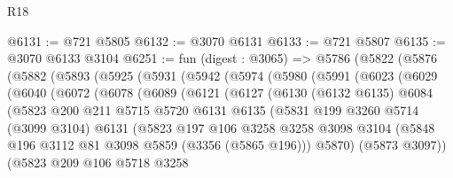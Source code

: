 \begin{lexlean}{R18}
\begin{coremodule}
@6131 := @721 @5805
@6132 := @3070 @6131
@6133 := @721 @5807
@6135 := @3070 @6133 @3104
@6251 := fun (digest : @3065) =>
  @5786
    (@5822
      (@5876
        (@5882
          (@5893
            (@5925
              (@5931
                (@5942
                  (@5974
                    (@5980
                      (@5991
                        (@6023
                          (@6029
                            (@6040
                              (@6072
                                (@6078
                                  (@6089
                                    (@6121
                                      (@6127
                                        (@6130
                                          (@6132 @6135)
                                          @6084
                                          (@5823
                                            @200
                                            @211
                                            @5715
                                            @5720
                                            @6131
                                            @6135
                                            (@5831
                                              @199
                                              @3260
                                              @5714
                                              (@3099 @3104)
                                              @6131
                                              (@5823
                                                @197
                                                @106
                                                @3258
                                                @3258
                                                @3098
                                                @3104
                                                (@5848
                                                  @196
                                                  @3112
                                                  @81
                                                  @3098
                                                  @5859
                                                  (@3356 (@5865 @196)))
                                                @5870)
                                              (@5873 @3097))
                                            (@5823
                                              @209
                                              @106
                                              @5718
                                              @3258

\end{coremodule}
\end{lexlean}

